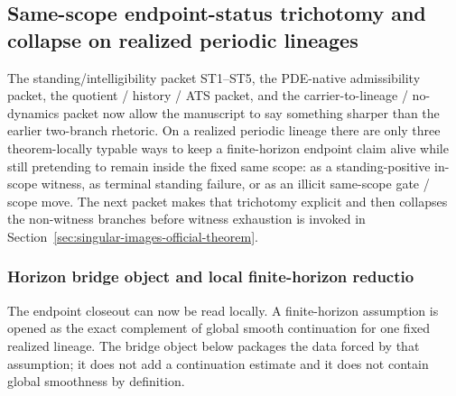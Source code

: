 \subsection{Same-scope endpoint-status trichotomy and collapse on realized periodic lineages}
\label{subsec:same-scope-continuation-failure-dichotomy}
The standing/intelligibility packet ST1--ST5, the PDE-native admissibility packet, the quotient / history / ATS packet, and the carrier-to-lineage / no-dynamics packet now allow the manuscript to say something sharper than the earlier two-branch rhetoric. On a realized periodic lineage there are only three theorem-locally typable ways to keep a finite-horizon endpoint claim alive while still pretending to remain inside the fixed same scope: as a standing-positive in-scope witness, as terminal standing failure, or as an illicit same-scope gate / scope move. The next packet makes that trichotomy explicit and then collapses the non-witness branches before witness exhaustion is invoked in Section~\ref{sec:singular-images-official-theorem}.


\subsubsection*{Horizon bridge object and local finite-horizon reductio}
The endpoint closeout can now be read locally. A finite-horizon assumption is opened as the exact complement of global smooth continuation for one fixed realized lineage. The bridge object below packages the data forced by that assumption; it does not add a continuation estimate and it does not contain global smoothness by definition.

